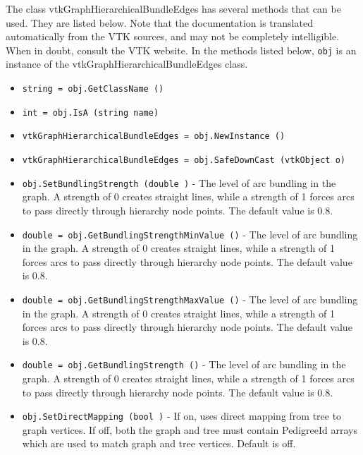 The class vtkGraphHierarchicalBundleEdges has several methods that can be used.
  They are listed below.
Note that the documentation is translated automatically from the VTK sources,
and may not be completely intelligible.  When in doubt, consult the VTK website.
In the methods listed below, \verb|obj| is an instance of the vtkGraphHierarchicalBundleEdges class.
\begin{itemize}
\item  \verb|string = obj.GetClassName ()|

\item  \verb|int = obj.IsA (string name)|

\item  \verb|vtkGraphHierarchicalBundleEdges = obj.NewInstance ()|

\item  \verb|vtkGraphHierarchicalBundleEdges = obj.SafeDownCast (vtkObject o)|

\item  \verb|obj.SetBundlingStrength (double )| -  The level of arc bundling in the graph.
 A strength of 0 creates straight lines, while a strength of 1
 forces arcs to pass directly through hierarchy node points.
 The default value is 0.8.

\item  \verb|double = obj.GetBundlingStrengthMinValue ()| -  The level of arc bundling in the graph.
 A strength of 0 creates straight lines, while a strength of 1
 forces arcs to pass directly through hierarchy node points.
 The default value is 0.8.

\item  \verb|double = obj.GetBundlingStrengthMaxValue ()| -  The level of arc bundling in the graph.
 A strength of 0 creates straight lines, while a strength of 1
 forces arcs to pass directly through hierarchy node points.
 The default value is 0.8.

\item  \verb|double = obj.GetBundlingStrength ()| -  The level of arc bundling in the graph.
 A strength of 0 creates straight lines, while a strength of 1
 forces arcs to pass directly through hierarchy node points.
 The default value is 0.8.

\item  \verb|obj.SetDirectMapping (bool )| -  If on, uses direct mapping from tree to graph vertices.
 If off, both the graph and tree must contain PedigreeId arrays
 which are used to match graph and tree vertices.
 Default is off.


\end{itemize}
